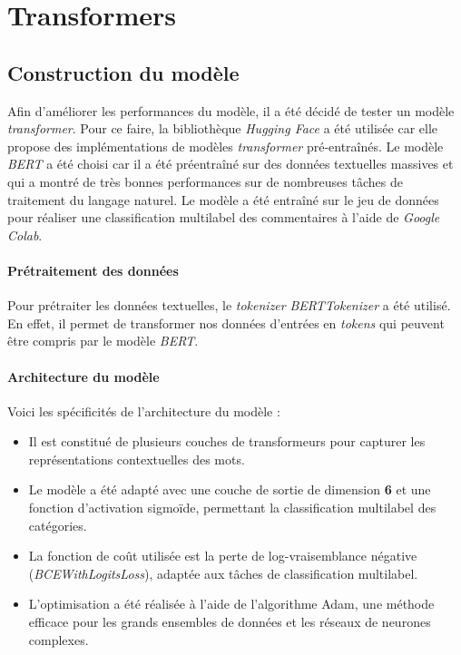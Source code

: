 \chapter{Transformers}

\section{Construction du modèle}

Afin d'améliorer les performances du modèle, il a été décidé de tester un modèle \textit{transformer}.
Pour ce faire, la bibliothèque \textit{Hugging Face} a été utilisée car elle propose des implémentations de modèles \textit{transformer} pré-entraînés.
Le modèle \textit{BERT} a été choisi car il a été préentraîné sur des données textuelles massives et qui a montré de très bonnes performances sur de nombreuses tâches de traitement du langage naturel.
Le modèle a été entraîné sur le jeu de données pour réaliser une classification multilabel des commentaires à l'aide de \textit{Google Colab}.

\subsubsection{Prétraitement des données}

Pour prétraiter les données textuelles, le \textit{tokenizer} \textit{BERTTokenizer} a été utilisé. En effet, il permet de transformer nos données d'entrées en \textit{tokens} qui peuvent être compris par le modèle \textit{BERT}.

\subsubsection{Architecture du modèle}

Voici les spécificités de l'architecture du modèle :

\begin{itemize}
\item Il est constitué de plusieurs couches de transformeurs pour capturer les représentations contextuelles des mots.
\item Le modèle a été adapté avec une couche de sortie de dimension \textbf{6} et une fonction d'activation sigmoïde, permettant la classification multilabel des catégories.
\item La fonction de coût utilisée est la perte de log-vraisemblance négative (\textit{BCEWithLogitsLoss}), adaptée aux tâches de classification multilabel.
\item L'optimisation a été réalisée à l'aide de l'algorithme Adam, une méthode efficace pour les grands ensembles de données et les réseaux de neurones complexes.
\end{itemize}

